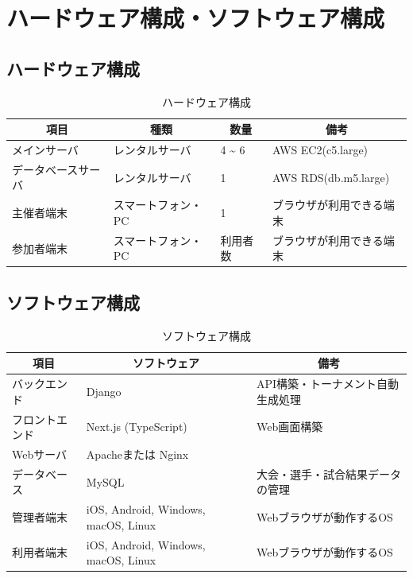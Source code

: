 \section{ハードウェア構成・ソフトウェア構成}

\subsection{ハードウェア構成}
\begin{table}[H]
  \centering
  \caption{ハードウェア構成}
  \label{tab:hardware}
  \begin{tabular}{|l|l|l|l|}
    \hline
    \multicolumn{1}{|c|}{項目} & \multicolumn{1}{c|}{種類} & \multicolumn{1}{c|}{数量} & \multicolumn{1}{c|}{備考} \\ \hline
    メインサーバ & レンタルサーバ & 4 \textasciitilde{} 6 & AWS EC2(c5.large) \\ \hline
    データベースサーバ & レンタルサーバ & 1 & AWS RDS(db.m5.large) \\ \hline
    主催者端末 & スマートフォン・PC & 1 & ブラウザが利用できる端末 \\ \hline
    参加者端末 & スマートフォン・PC & 利用者数 & ブラウザが利用できる端末 \\ \hline
  \end{tabular}
\end{table}

\subsection{ソフトウェア構成}
\begin{table}[H]
  \centering
  \caption{ソフトウェア構成}
  \label{tab:software}
  \begin{tabular}{|l|l|l|}
    \hline
    \multicolumn{1}{|c|}{項目} & \multicolumn{1}{c|}{ソフトウェア} & \multicolumn{1}{c|}{備考} \\ \hline
    バックエンド & Django & API構築・トーナメント自動生成処理 \\ \hline
    フロントエンド & Next.js (TypeScript) & Web画面構築 \\ \hline
    Webサーバ & Apacheまたは Nginx & \\ \hline
    データベース & MySQL & 大会・選手・試合結果データの管理 \\ \hline
    管理者端末 & iOS, Android, Windows, macOS, Linux & Webブラウザが動作するOS \\ \hline
    利用者端末 & iOS, Android, Windows, macOS, Linux & Webブラウザが動作するOS \\ \hline
  \end{tabular}
\end{table}